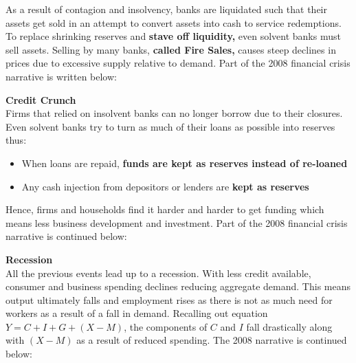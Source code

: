 \documentclass[12pt, letterpaper]{article}
\begin{document}
As a result of contagion and insolvency, banks are liquidated such that their assets get sold in an attempt to convert assets into cash to service redemptions. To replace shrinking reserves and \textbf{stave off liquidity,} even solvent banks must sell assets. Selling by many banks, \textbf{called Fire Sales,} causes steep declines in prices due to excessive supply relative to demand. Part of the 2008 financial crisis narrative is written below:
\begin{center}
\noindent{}
\end{center}
\textbf{Credit Crunch}\\
Firms that relied on insolvent banks can no longer borrow due to their closures. Even solvent banks try to turn as much of their loans as possible into reserves thus:
\begin{itemize}
	\item When loans are repaid, \textbf{funds are kept as reserves instead of re-loaned}
	\item Any cash injection from depositors or lenders are \textbf{kept as reserves}
\end{itemize}
Hence, firms and households find it harder and harder to get funding which means less business development and investment. Part of the 2008 financial crisis narrative is continued below:
\begin{center}
\noindent{}
\end{center}
\textbf{Recession}\\
All the previous events lead up to a recession. With less credit available, consumer and business spending declines reducing aggregate demand. This means output ultimately falls and employment rises as there is not as much need for workers as a result of a fall in demand. Recalling out equation $Y = C + I + G + (X - M)$, the components of $C$ and $I$ fall drastically along with $(X-M)$ as a result of reduced spending. The 2008 narrative is continued below:
\end{document}
